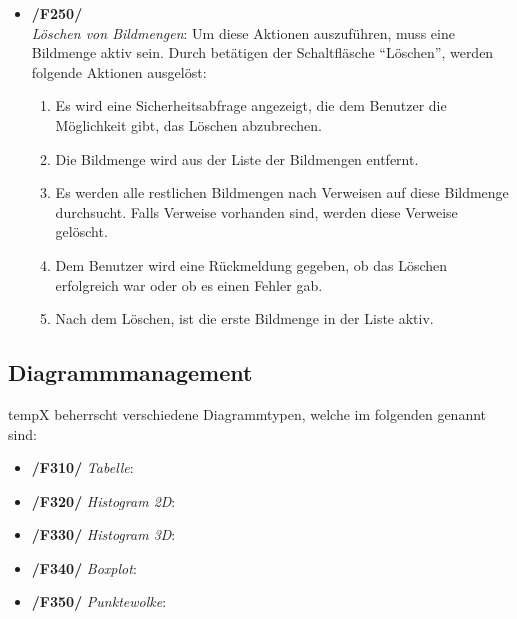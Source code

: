 \begin{itemize}
		\item \textbf{/F250/}\\ \textit{Löschen von Bildmengen}: Um diese Aktionen auszuführen, muss eine Bildmenge aktiv sein. Durch betätigen der Schaltfläsche "`Löschen"', werden folgende Aktionen ausgelöst:
			\begin{enumerate}
				\item Es wird eine Sicherheitsabfrage angezeigt, die dem Benutzer die Möglichkeit gibt, das Löschen abzubrechen.
				\item Die Bildmenge wird aus der Liste der Bildmengen entfernt.
				\item Es werden alle restlichen Bildmengen nach Verweisen auf diese Bildmenge durchsucht. Falls Verweise vorhanden sind, werden diese Verweise gelöscht.
				\item Dem Benutzer wird eine Rückmeldung gegeben, ob das Löschen erfolgreich war oder ob es einen Fehler gab.
				\item Nach dem Löschen, ist die erste Bildmenge in der Liste aktiv.
			\end{enumerate}
	\end{itemize}

\subsection{Diagrammmanagement}
	\gls{tempX} beherrscht verschiedene Diagrammtypen, welche im folgenden genannt sind:
	
	\begin{itemize}
		\item \textbf{/F310/} \textit{Tabelle}: 
		\item \textbf{/F320/} \textit{Histogram 2D}: 
		\item \textbf{/F330/} \textit{Histogram 3D}: 
		\item \textbf{/F340/} \textit{Boxplot}: 
		\item \textbf{/F350/} \textit{Punktewolke}: 
	\end{itemize}

